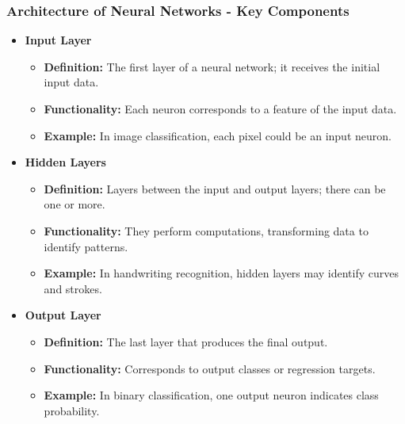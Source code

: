 \documentclass[aspectratio=169]{beamer}
\begin{document}
\begin{frame}[fragile]
    \frametitle{Architecture of Neural Networks - Key Components}
    \begin{itemize}
        \item \textbf{Input Layer}
            \begin{itemize}
                \item \textbf{Definition:} The first layer of a neural network; it receives the initial input data.
                \item \textbf{Functionality:} Each neuron corresponds to a feature of the input data.
                \item \textbf{Example:} In image classification, each pixel could be an input neuron.
            \end{itemize}
        
        \item \textbf{Hidden Layers}
            \begin{itemize}
                \item \textbf{Definition:} Layers between the input and output layers; there can be one or more.
                \item \textbf{Functionality:} They perform computations, transforming data to identify patterns.
                \item \textbf{Example:} In handwriting recognition, hidden layers may identify curves and strokes.
            \end{itemize}

        \item \textbf{Output Layer}
            \begin{itemize}
                \item \textbf{Definition:} The last layer that produces the final output.
                \item \textbf{Functionality:} Corresponds to output classes or regression targets.
                \item \textbf{Example:} In binary classification, one output neuron indicates class probability.
            \end{itemize}
    \end{itemize}
\end{frame}
\end{document}
